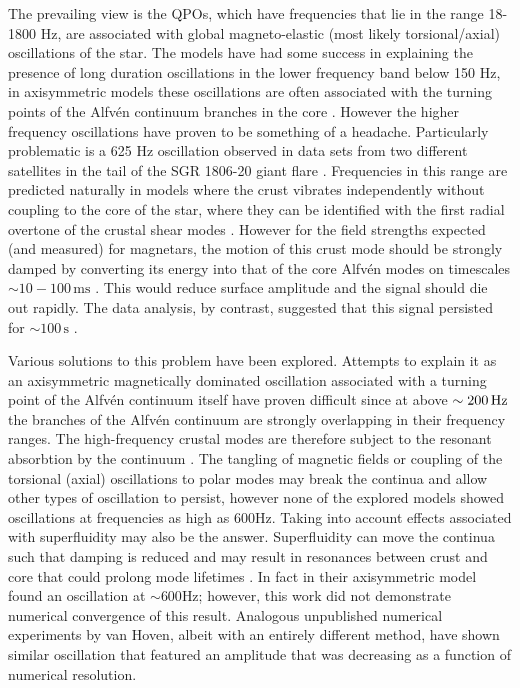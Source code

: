 \documentclass{emulateapj}
\begin{document}
The prevailing view is the QPOs, which have frequencies that lie in the range 18-1800 Hz, are associated with global magneto-elastic (most likely torsional/axial) oscillations of the star. The models have had some success in explaining the presence of long duration oscillations in the lower frequency band below 150 Hz, in axisymmetric models these oscillations are often associated with the turning points of the Alfv\'en continuum branches in the core \citep{Levin07}. However the higher frequency oscillations have proven to be something of a headache. Particularly problematic is a 625 Hz oscillation observed in data sets from two different satellites in the tail of the SGR 1806-20 giant flare \citep{Watts06, Strohmayer06}.  Frequencies in this range are predicted naturally in models where the crust vibrates independently without coupling to the core of the star, where they can be identified with the first radial overtone of the crustal shear modes \citep{Piro05}.  However for the field strengths expected (and measured) for magnetars, the motion of this crust mode should be strongly damped by converting its energy into that of the core Alfv\'en modes on timescales $\sim10-100 \, \mathrm{ms}$ \citep{Levin06,vanHoven11,Colaiuda11,Gabler12}. This would reduce surface amplitude and the signal should die out rapidly. The data analysis, by contrast, suggested that this signal persisted for $\sim100 \, \mathrm{s}$ \citep{Strohmayer06}.


Various solutions to this problem have been explored. Attempts to explain it as an axisymmetric magnetically dominated oscillation associated with a turning point of the Alfv\'en continuum itself have proven difficult since at above $\sim 200\,\mathrm{Hz}$ the branches of the Alfv\'en continuum are strongly overlapping in their frequency ranges.  The high-frequency crustal modes are therefore subject to the resonant absorbtion by the continuum \citep{vanHoven11, vanHoven12}. The tangling of magnetic fields \citep{vanHoven11}  or coupling of the torsional (axial) oscillations to polar modes \citep{Colaiuda12,Lander10,Lander11} may break the continua and allow other types of oscillation to persist,
however none of the explored models showed oscillations at frequencies as high as $600$Hz. Taking into account effects associated with superfluidity may also be the answer. Superfluidity can move the continua such that damping is reduced \citep{vanHoven08, Andersson09, Passamonti13a} and may result in resonances between crust and core that could prolong mode lifetimes \citep{Gabler13, Passamonti13b}.  In fact in their axisymmetric model \citep{Gabler13} found an oscillation at $\sim 600$Hz; however, this work
did not demonstrate  numerical convergence of this result. Analogous unpublished numerical experiments
by van Hoven, albeit with an entirely different method, have shown similar oscillation that featured an amplitude that was decreasing as a function of numerical resolution.
\end{document}
